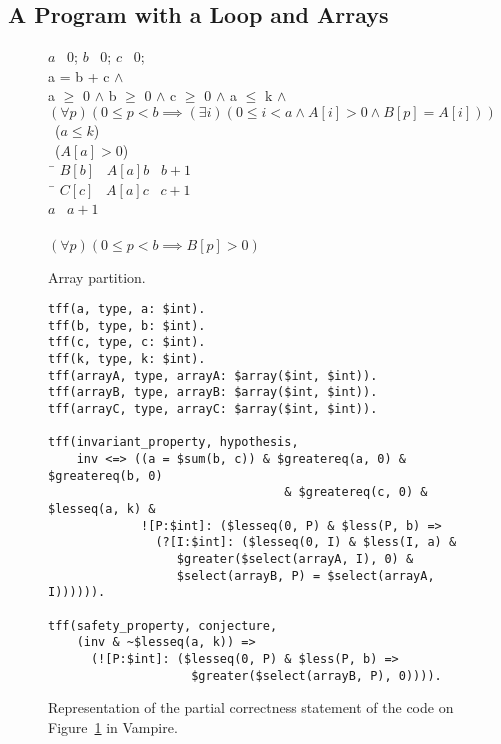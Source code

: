 \subsection{A Program with a Loop and Arrays}

\begin{figure*}[bt]
{
  \vspace{-1em}
  \begin{center}
    \parbox{0cm}{
  \begin{tabbing}
    $a$ \ass\ $0$; $b$ \ass\ $0$; $c$ \ass\ $0$; \\[.5em]
     a = b + c $\wedge$ \\
    {\color{white}} a $\geq$ 0 $\wedge$ b $\geq$ 0 $\wedge$ c $\geq$
    0 $\wedge$ a $\leq$ k $\wedge$ \\
    {\color{white}} $(\forall p) (0\leq p<b \implies
    (\exists i) (0 \leq i < a \wedge A[i] > 0 \wedge B[p] = A[i]))$\\[1em]
    \WHILE\ ($a \leq k$) \DO \\ \inc
      \IF\ ($A[a] > 0$) \\ \inc
        \THEN\ \=\+ $B[b]$ \ass\ $A[a]$\semicol $b$ \ass\ $b+1$\semicol \\ \dec
        \ELSE\ \=\+ $C[c]$ \ass\ $A[a]$\semicol $c$ \ass\ $c+1$\semicol \\ \dec \dec
      $a$ \ass\ $a+1$\semicol \\ \dec
    \OD\\[.5em]
     $(\forall p)(0 \leq p<b \implies B[p]> 0)$
  \end{tabbing}
    }
  \end{center}
  \vspace{-2em}
  \caption{Array partition.\label{fig:partition}}
}
\end{figure*}

\begin{figure*}[tb]
{\small
\begin{lstlisting}
tff(a, type, a: $int).
tff(b, type, b: $int).
tff(c, type, c: $int).
tff(k, type, k: $int).
tff(arrayA, type, arrayA: $array($int, $int)).
tff(arrayB, type, arrayB: $array($int, $int)).
tff(arrayC, type, arrayC: $array($int, $int)).

tff(invariant_property, hypothesis,
    inv <=> ((a = $sum(b, c)) & $greatereq(a, 0) & $greatereq(b, 0)
                                 & $greatereq(c, 0) & $lesseq(a, k) &
             ![P:$int]: ($lesseq(0, P) & $less(P, b) =>
               (?[I:$int]: ($lesseq(0, I) & $less(I, a) &
                  $greater($select(arrayA, I), 0) &
                  $select(arrayB, P) = $select(arrayA, I)))))).

tff(safety_property, conjecture,
    (inv & ~$lesseq(a, k)) =>
      (![P:$int]: ($lesseq(0, P) & $less(P, b) =>
                    $greater($select(arrayB, P), 0)))).
\end{lstlisting}
\caption{Representation of the partial correctness statement of the code on Figure~\ref{fig:partition} in Vampire\label{fig:loop_safety_Vampire}.}
}
\end{figure*}

